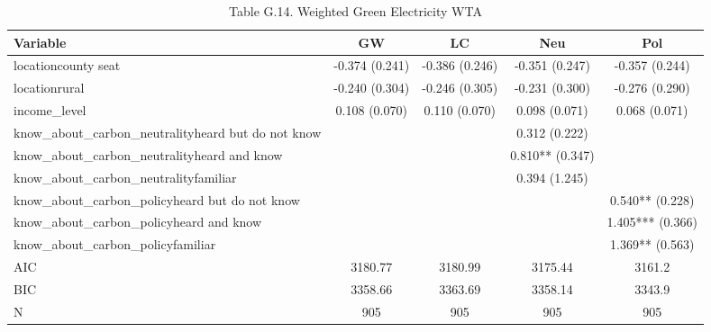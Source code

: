 \begin{table}[!htbp]
\centering
\caption{Table G.14. Weighted Green Electricity WTA}
\begin{tabular}{lcccc}
\hline
Variable & GW & LC & Neu & Pol \\
\hline
locationcounty seat & -0.374 (0.241) & -0.386 (0.246) & -0.351 (0.247) & -0.357 (0.244) \\
locationrural & -0.240 (0.304) & -0.246 (0.305) & -0.231 (0.300) & -0.276 (0.290) \\
income\_level & 0.108 (0.070) & 0.110 (0.070) & 0.098 (0.071) & 0.068 (0.071) \\
know\_about\_carbon\_neutralityheard but do not know &  &  & 0.312 (0.222) &  \\
know\_about\_carbon\_neutralityheard and know &  &  & 0.810** (0.347) &  \\
know\_about\_carbon\_neutralityfamiliar &  &  & 0.394 (1.245) &  \\
know\_about\_carbon\_policyheard but do not know &  &  &  & 0.540** (0.228) \\
know\_about\_carbon\_policyheard and know &  &  &  & 1.405*** (0.366) \\
know\_about\_carbon\_policyfamiliar &  &  &  & 1.369** (0.563) \\
AIC & 3180.77 & 3180.99 & 3175.44 & 3161.2 \\
BIC & 3358.66 & 3363.69 & 3358.14 & 3343.9 \\
N & 905 & 905 & 905 & 905 \\
\hline
\end{tabular}
\end{table}
